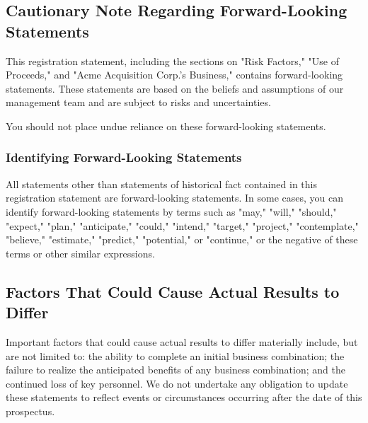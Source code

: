 
\subsection{Cautionary Note Regarding Forward-Looking Statements}

This registration statement, including the sections on "Risk Factors," "Use of Proceeds," and "Acme Acquisition Corp.'s Business," contains forward-looking statements. These statements are based on the beliefs and assumptions of our management team and are subject to risks and uncertainties.

 You should not place undue reliance on these forward-looking statements.

\subsubsection*{Identifying Forward-Looking Statements}
All statements other than statements of historical fact contained in this registration statement are forward-looking statements. In some cases, you can identify forward-looking statements by terms such as "may," "will," "should," "expect," "plan," "anticipate," "could," "intend," "target," "project," "contemplate," "believe," "estimate," "predict," "potential," or "continue," or the negative of these terms or other similar expressions.

\subsection{Factors That Could Cause Actual Results to Differ}
 Important factors that could cause actual results to differ materially include, but are not limited to: the ability to complete an initial business combination; the failure to realize the anticipated benefits of any business combination; and the continued loss of key personnel. We do not undertake any obligation to update these statements to reflect events or circumstances occurring after the date of this prospectus.

